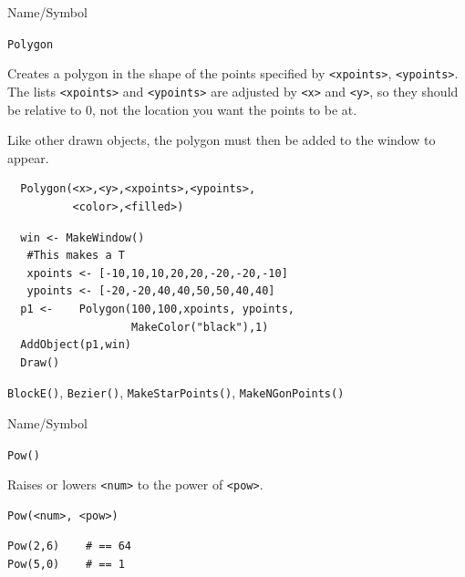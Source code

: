 \begin{desc}{Name/Symbol}
\item[Name/Symbol]  	\verb+Polygon+ 

\item[Description] Creates a polygon in the shape of the points
specified by \verb+<xpoints>+, \verb+<ypoints>+. The lists \verb+<xpoints>+ and
\verb+<ypoints>+ are adjusted by  \verb+<x>+ and \verb+<y>+, so they
should be relative to 0, not the location you want the points to be at.

Like other drawn objects, the polygon must then be added to the window
to appear.

\item[Usage]		
\begin{verbatim}
  Polygon(<x>,<y>,<xpoints>,<ypoints>,
          <color>,<filled>)
\end{verbatim}

\item[Example]	
\begin{verbatim}
  win <- MakeWindow()
   #This makes a T
   xpoints <- [-10,10,10,20,20,-20,-20,-10]
   ypoints <- [-20,-20,40,40,50,50,40,40]
  p1 <-    Polygon(100,100,xpoints, ypoints,
                   MakeColor("black"),1)
  AddObject(p1,win)
  Draw()
\end{verbatim}

\item[See Also]   
\verb+BlockE()+, \verb+Bezier()+, \verb+MakeStarPoints()+,
\verb+MakeNGonPoints()+
\end{desc}

\begin{desc}{Name/Symbol}
\item[Name/Symbol]	\verb+Pow()+ 

\item[Description]	Raises or lowers \verb+<num>+ to the power of \verb+<pow>+.

\item[Usage]		
\begin{verbatim}
Pow(<num>, <pow>)
\end{verbatim}

\item[Example]	
\begin{verbatim}
Pow(2,6)	# == 64
Pow(5,0)	# == 1
\end{verbatim}

\item[See Also]     
\end{desc}

